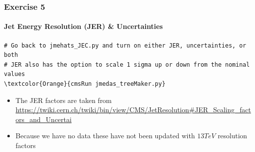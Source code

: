 \begin{frame}[fragile]
	\frametitle{Exercise 5}
	\framesubtitle{Jet Energy Resolution (JER) \& Uncertainties}

\begin{Verbatim}[label={Exercise 5}]
# Go back to jmehats_JEC.py and turn on either JER, uncertainties, or both
# JER also has the option to scale 1 sigma up or down from the nominal values
\textcolor{Orange}{cmsRun jmedas_treeMaker.py}
\end{Verbatim}

\begin{block}{}
	\begin{itemize}
		\item The JER factors are taken from \href{https://twiki.cern.ch/twiki/bin/view/CMS/JetResolution#JER_Scaling_factors_and_Uncertai}{https://twiki.cern.ch/twiki/bin/view/CMS/JetResolution\#JER\_Scaling\_factors\_and\_Uncertai}
		\item Because we have no data these have not been updated with $13\unit{TeV}$ resolution factors
	\end{itemize}
\end{block}

\end{frame}



